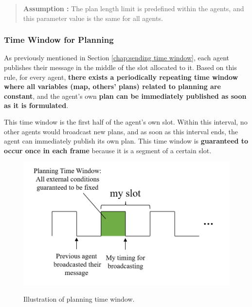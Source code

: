 \begin{quotation}
    \textbf{Assumption :}  
    The plan length limit is predefined within the agents, and this parameter value is the same for all agents.
\end{quotation}

\subsubsection{Time Window for Planning}
\label{chap:time window for planning}

As previously mentioned in Section \ref{chap:sending time window}, each agent publishes their message in the middle of the slot allocated to it.
Based on this rule, for every agent, \textbf{there exists a periodically repeating time window where all variables (map, others' plans) related to planning are constant}, 
and the agent's own \textbf{plan can be immediately published as soon as it is formulated}.

This time window is the first half of the agent's own slot. Within this interval, no other agents would broadcast new plans, and as soon as this interval ends, the agent can immediately publish its own plan.
This time window is \textbf{guaranteed to occur once in each frame} because it is a segment of a certain slot. 

\begin{figure}[htbp]
    \centering
    \includegraphics[width = 0.7\linewidth]{figures/PlanningTimeWindow.png}
    \label{fig:PlanningTimeWindow}
    \caption{Illustration of planning time window.}
\end{figure}

